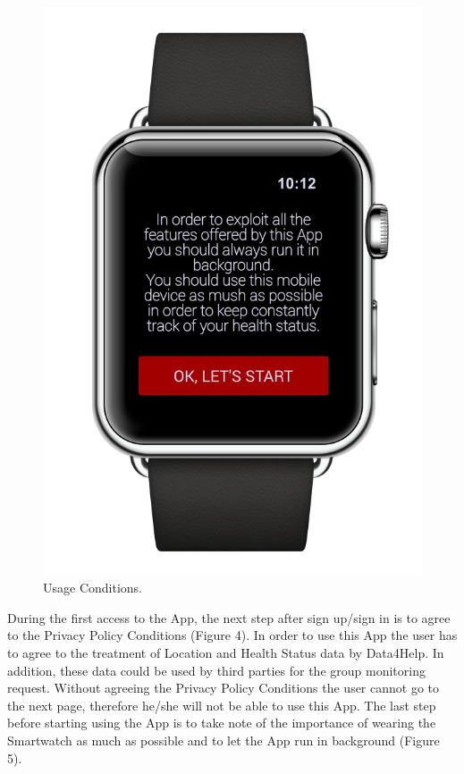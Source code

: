 \begin{enumerate}
\begin{figure}[H]
\begin{center}
\begin{minipage}[c]{.40\textwidth}
          \includegraphics[height=12 cm]{Images/Mockups/AutomatedSOSMockup4.png}
          	\caption{Usage Conditions.}
        \end{minipage}
      \end{center}
\end{figure}
During the first access to the App, the next step after sign up/sign in is to agree to the Privacy Policy Conditions (Figure 4). In order to use this App the user has to agree to the treatment of Location and Health Status data by Data4Help. In addition, these data could be used by third parties for the group monitoring request. Without agreeing the Privacy Policy Conditions the user cannot go to the next page, therefore he/she will not be able to use this App. The last step before starting using the App is to take note of the importance of wearing the Smartwatch as much as possible and to let the App run in background (Figure 5).
\clearpage
\begin{figure}
\begin{center}
	\bigbreak
        \begin{minipage}[c]{.40\textwidth}
        \centering

\end{minipage}
\end{center}
\end{figure}
\end{enumerate}
